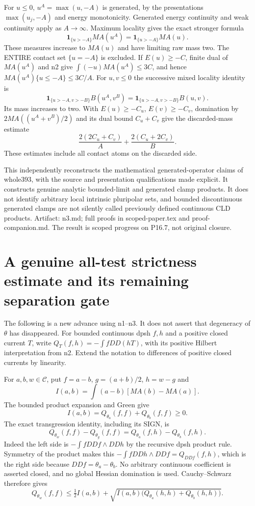 \documentclass[11pt]{article}
\begin{document}
For $u\le0$, $u^A=\max(u,-A)$ is generated, by the presentations $\max(u_j,-A)$ and energy monotonicity. Generated energy continuity and weak continuity apply as $A\to\infty$. Maximum locality gives the exact stronger formula
\[
 \mathbf1_{\{u>-A\}}MA(u^A)=\mathbf1_{\{u>-A\}}MA(u).
\]
These measures increase to $MA(u)$ and have limiting raw mass two. The ENTIRE contact set $\{u=-A\}$ is excluded. If $E(u)\ge-C$, finite dual of $MA(u^A)$ and n2 give $\int(-u)MA(u^A)\le3C$, and hence $MA(u^A)\{u\le-A\}\le3C/A$. For $u,v\le0$ the successive mixed locality identity is
\[
 \mathbf1_{\{u>-A,v>-B\}}B(u^A,v^B)
 =\mathbf1_{\{u>-A,v>-B\}}B(u,v).
\]
Its mass increases to two. With $E(u)\ge-C_u$, $E(v)\ge-C_v$, domination by $2MA((u^A+v^B)/2)$ and its dual bound $C_u+C_v$ give the discarded-mass estimate
\[
 \frac{2(2C_u+C_v)}A+\frac{2(C_u+2C_v)}B.
\]
These estimates include all contact atoms on the discarded side.

This independently reconstructs the mathematical generated-operator claims of whole393, with the source and presentation qualifications made explicit. It constructs genuine analytic bounded-limit and generated clamp products. It does not identify arbitrary local intrinsic pluripolar sets, and bounded discontinuous generated clamps are not silently called previously defined continuous CLD products. Artifact: n3.md; full proofs in scoped-paper.tex and proof-companion.md. The result is scoped progress on P16.7, not original closure.


\section*{A genuine all-test strictness estimate and its remaining separation gate}

The following is a new advance using n1--n3. It does not assert that degeneracy of $\theta$ has disappeared. For bounded continuous dpsh $f,h$ and a positive closed current $T$, write $Q_T(f,h)=-\int fDD(hT)$, with its positive Hilbert interpretation from n2. Extend the notation to differences of positive closed currents by linearity.

For $a,b,w\in\mathcal C$, put $f=a-b$, $g=(a+b)/2$, $h=w-g$ and
\[
 I(a,b)=\int(a-b)[MA(b)-MA(a)].
\]
The bounded product expansion and Green give
\[
 I(a,b)=Q_{\theta_a}(f,f)+Q_{\theta_b}(f,f)\ge0.
\]
The exact transgression identity, including its SIGN, is
\[
 Q_{\theta_w}(f,f)-Q_{\theta_g}(f,f)
 =Q_{\theta_a}(f,h)-Q_{\theta_b}(f,h).
\]
Indeed the left side is $-\int fDDf\wedge DDh$ by the recursive dpsh product rule. Symmetry of the product makes this $-\int fDDh\wedge DDf=Q_{DDf}(f,h)$, which is the right side because $DDf=\theta_a-\theta_b$. No arbitrary continuous coefficient is asserted closed, and no global Hessian domination is used. Cauchy--Schwarz therefore gives
\[
 Q_{\theta_w}(f,f)\le\tfrac12 I(a,b)
 +\sqrt{I(a,b)\bigl(Q_{\theta_a}(h,h)+Q_{\theta_b}(h,h)\bigr)}.
\]
\end{document}
